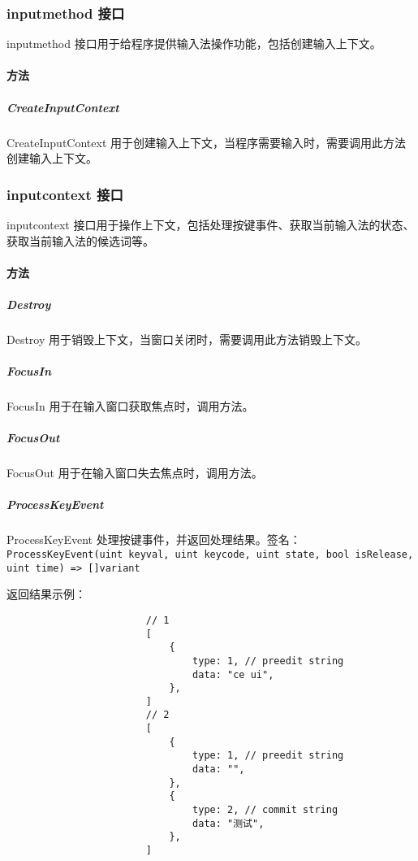 \documentclass{utart}
\begin{document}
        \subsubsection{inputmethod 接口}
            \par inputmethod 接口用于给程序提供输入法操作功能，包括创建输入上下文。
            \paragraph{方法}
                \subparagraph{CreateInputContext}
                    \par CreateInputContext 用于创建输入上下文，当程序需要输入时，需要调用此方法创建输入上下文。

        \subsubsection{inputcontext 接口}
            \par inputcontext 接口用于操作上下文，包括处理按键事件、获取当前输入法的状态、获取当前输入法的候选词等。
            \paragraph{方法}
                \subparagraph{Destroy}
                    \par Destroy 用于销毁上下文，当窗口关闭时，需要调用此方法销毁上下文。
                \subparagraph{FocusIn}
                    \par FocusIn 用于在输入窗口获取焦点时，调用方法。
                \subparagraph{FocusOut}
                    \par FocusOut 用于在输入窗口失去焦点时，调用方法。
                \subparagraph{ProcessKeyEvent}
                    \par ProcessKeyEvent 处理按键事件，并返回处理结果。签名：\texttt{ProcessKeyEvent(uint keyval, uint keycode, uint state, bool isRelease, uint time) => []variant}
                    \par 返回结果示例：
                    \begin{verbatim}
                        // 1
                        [
                            {
                                type: 1, // preedit string
                                data: "ce ui",
                            },
                        ]
                        // 2
                        [
                            {
                                type: 1, // preedit string
                                data: "",
                            },
                            {
                                type: 2, // commit string
                                data: "测试",
                            },
                        ]
                    \end{verbatim}

\end{document}

